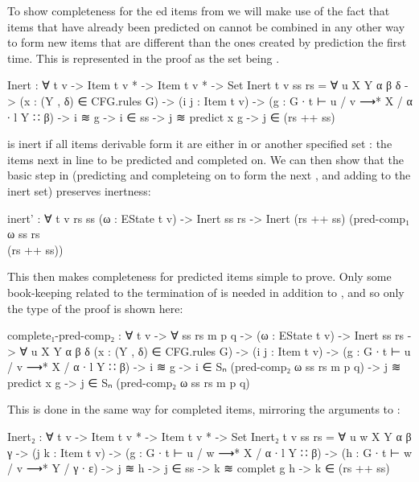 		To show completeness for the ed items from 
		 we will make use of the fact that items that have 
		already been predicted on cannot be combined in any other way to form 
		new items that are different than the ones created by prediction the 
		first time. This is represented in the proof as the set  
		being .

		\begin{code}
			Inert : ∀ {t v} -> Item t v * -> Item t v * -> Set
			Inert {t} {v} ss rs =
			  ∀ {u X Y α β δ} ->
			  (x : (Y , δ) ∈ CFG.rules G) ->
			  (i j : Item t v) ->
			  (g : G ∙ t ⊢ u / v ⟶* X / α ∙ l Y ∷ β) ->
			  i ≋ g -> i ∈ ss ->
			  j ≋ predict x g ->
			    j ∈ (rs ++ ss)
		\end{code}
		
		 is inert if all items derivable form it are either in
		 or another specified set : the items next in
		line to be predicted and completed on. We can then show that the basic
		step in  (predicting and completeing on 
		to form the next , and adding  to the inert set) 
		preserves inertness:

		\begin{code}
			inert' : ∀ {t v rs ss} (ω : EState t v) ->
			  Inert ss rs -> Inert (rs ++ ss) (pred-comp₁ ω ss rs \\ (rs ++ ss))
		\end{code}

		This then makes completeness for  predicted items
		simple to prove. Only some book-keeping related to the termination of
		 is needed in addition to , and so
		only the type of the proof is shown here:

		\begin{code}
			complete₁-pred-comp₂ : ∀ {t v} -> ∀ ss rs m p q ->
			  (ω : EState t v) ->
			  Inert ss rs ->
			  ∀ {u X Y α β δ}
			  (x : (Y , δ) ∈ CFG.rules G) ->
			  (i j : Item t v) ->
			  (g : G ∙ t ⊢ u / v ⟶* X / α ∙ l Y ∷ β) ->
			  i ≋ g ->
			  i ∈ Sₙ (pred-comp₂ ω ss rs m p q) ->
			  j ≋ predict x g ->
			    j ∈ Sₙ (pred-comp₂ ω ss rs m p q)
		\end{code}
		
		This is done in the same way for completed items, mirroring the 
		arguments to :
		
		\begin{code}
			Inert₂ : ∀ {t v} -> Item t v * -> Item t v * -> Set
			Inert₂ {t} {v} ss rs =
			  ∀ {u w X Y α β γ} ->
			  (j k : Item t v) ->
			  (g : G ∙ t ⊢ u / w ⟶* X / α ∙ l Y ∷ β) ->
			  (h : G ∙ t ⊢ w / v ⟶* Y / γ ∙ ε) ->
			  j ≋ h -> j ∈ ss ->
			  k ≋ complet g h ->
			    k ∈ (rs ++ ss)
		\end{code}
		
